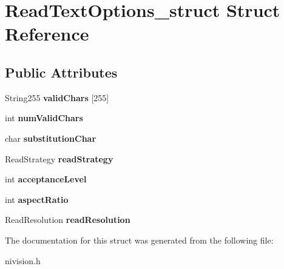 \hypertarget{structReadTextOptions__struct}{\section{\-Read\-Text\-Options\-\_\-struct \-Struct \-Reference}
\label{structReadTextOptions__struct}
}
\subsection*{\-Public \-Attributes}
\begin{DoxyCompactItemize}
\item 
\hypertarget{structReadTextOptions__struct_af0730ab0ea94564eb0b74f01cbddd43e}{\-String255 {\bfseries valid\-Chars} \mbox{[}255\mbox{]}}\label{structReadTextOptions__struct_af0730ab0ea94564eb0b74f01cbddd43e}

\item 
\hypertarget{structReadTextOptions__struct_af474dd14a31bb084d89e4b1051942860}{int {\bfseries num\-Valid\-Chars}}\label{structReadTextOptions__struct_af474dd14a31bb084d89e4b1051942860}

\item 
\hypertarget{structReadTextOptions__struct_a44a5ecc650d4aa90309c2387661748f7}{char {\bfseries substitution\-Char}}\label{structReadTextOptions__struct_a44a5ecc650d4aa90309c2387661748f7}

\item 
\hypertarget{structReadTextOptions__struct_afdf3782760c5d97e2c9307143b913831}{\-Read\-Strategy {\bfseries read\-Strategy}}\label{structReadTextOptions__struct_afdf3782760c5d97e2c9307143b913831}

\item 
\hypertarget{structReadTextOptions__struct_aca7ab9ca712358b6f90f23bd7f52ce7b}{int {\bfseries acceptance\-Level}}\label{structReadTextOptions__struct_aca7ab9ca712358b6f90f23bd7f52ce7b}

\item 
\hypertarget{structReadTextOptions__struct_aad3b6174909ad4b38bc02a0689d06c33}{int {\bfseries aspect\-Ratio}}\label{structReadTextOptions__struct_aad3b6174909ad4b38bc02a0689d06c33}

\item 
\hypertarget{structReadTextOptions__struct_a931b2d3e8a16146cd8946a26f252a4e1}{\-Read\-Resolution {\bfseries read\-Resolution}}\label{structReadTextOptions__struct_a931b2d3e8a16146cd8946a26f252a4e1}

\end{DoxyCompactItemize}


\-The documentation for this struct was generated from the following file\-:\begin{DoxyCompactItemize}
\item 
nivision.\-h\end{DoxyCompactItemize}
